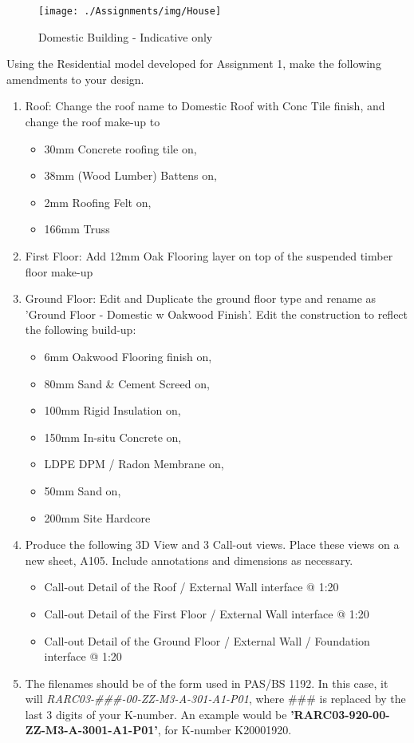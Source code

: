 \begin{figure}
	\centering
	\texttt{[image: ./Assignments/img/House]}
	\caption{Domestic Building - Indicative only}
	\label{fig:house}
\end{figure}



Using the Residential model developed for Assignment 1, make the following amendments to your design.
\begin{enumerate}
	\item\label{itm:roof} Roof: Change the roof name to Domestic Roof with Conc Tile finish, and change the roof make-up to 
	\begin{itemize}
		\item 30mm Concrete roofing tile on,
		\item 38mm (Wood Lumber) Battens on,
		\item 2mm Roofing Felt on,
		\item 166mm Truss
	\end{itemize}
	\item\label{itm:FirstFloor} First Floor: Add 12mm Oak Flooring layer on top of the suspended timber floor make-up
	\item\label{itm:GroundFloor} Ground Floor: Edit and Duplicate the ground floor type and rename as 'Ground Floor - Domestic w Oakwood Finish'.  Edit the construction to reflect the following build-up:
	\begin{itemize}
		\item 6mm Oakwood Flooring finish on,
		\item 80mm Sand \& Cement Screed on,
		\item 100mm Rigid Insulation on,
		\item 150mm In-situ Concrete on,
		\item LDPE DPM / Radon Membrane on,
		\item 50mm Sand on,
		\item 200mm Site Hardcore
	\end{itemize}
	\item Produce the following 3D View and 3 Call-out views. Place these views on a new sheet, A105.  Include annotations and dimensions as necessary.
	\begin{itemize}
		\item Call-out Detail of the Roof / External Wall interface @ 1:20
		\item Call-out Detail of the First Floor / External Wall interface @ 1:20
		\item Call-out Detail of the Ground Floor / External Wall / Foundation interface @ 1:20
	\end{itemize}
	\item The filenames should be of the form used in PAS/BS 1192.  In this case, it will \textit{RARC03-\#\#\#-00-ZZ-M3-A-301-A1-P01}, where \#\#\# is replaced by the last 3 digits of your K-number. An example would be \textbf{'RARC03-920-00-ZZ-M3-A-3001-A1-P01'}, for K-number K20001920.
\end{enumerate}
